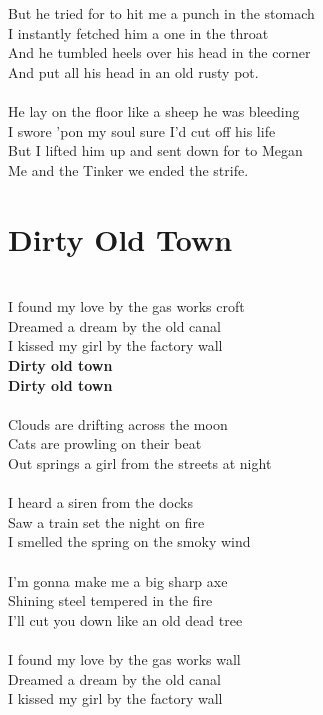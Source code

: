 \documentclass[letterpaper,9pt]{article}
\begin{document}
\\
\\But he tried for to hit me a punch in the stomach
\\I instantly fetched him a one in the throat
\\And he tumbled heels over his head in the corner
\\And put all his head in an old rusty pot.
\\
\\He lay on the floor like a sheep he was bleeding
\\I swore 'pon my soul sure I'd cut off his life
\\But I lifted him up and sent down for to Megan
\\Me and the Tinker we ended the strife.

\newpage
\section{Dirty Old Town}
\huge
\noindent
\\I found my love by the gas works croft
\\Dreamed a dream by the old canal
\\I kissed my girl by the factory wall
\\\textbf{Dirty old town}
\\\textbf{Dirty old town}
\\
\\Clouds are drifting across the moon
\\Cats are prowling on their beat
\\Out springs a girl from the streets at night
\\
\\I heard a siren from the docks
\\Saw a train set the night on fire
\\I smelled the spring on the smoky wind
\\
\\I'm gonna make me a big sharp axe
\\Shining steel tempered in the fire
\\I'll cut you down like an old dead tree
\\
\\I found my love by the gas works wall
\\Dreamed a dream by the old canal
\\I kissed my girl by the factory wall
\end{document}
